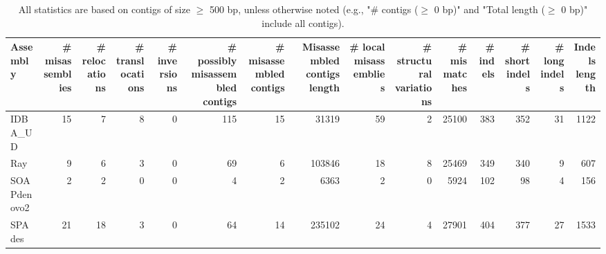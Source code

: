 \documentclass[12pt,a4paper]{article}
\begin{document}
\begin{table}[ht]
\begin{center}
\caption{All statistics are based on contigs of size $\geq$ 500 bp, unless otherwise noted (e.g., "\# contigs ($\geq$ 0 bp)" and "Total length ($\geq$ 0 bp)" include all contigs).}
\begin{tabular}{|l*{14}{|r}|}
\hline
Assembly & \# misassemblies &     \# relocations &     \# translocations &     \# inversions & \# possibly misassembled contigs & \# misassembled contigs & Misassembled contigs length & \# local misassemblies & \# structural variations & \# mismatches & \# indels &     \# short indels &     \# long indels & Indels length \\ \hline
IDBA\_UD & 15 & 7 & 8 & 0 & 115 & 15 & 31319 & 59 & 2 & 25100 & 383 & 352 & 31 & 1122 \\ \hline
Ray & 9 & 6 & 3 & 0 & 69 & 6 & 103846 & 18 & 8 & 25469 & 349 & 340 & 9 & 607 \\ \hline
SOAPdenovo2 & 2 & 2 & 0 & 0 & 4 & 2 & 6363 & 2 & 0 & 5924 & 102 & 98 & 4 & 156 \\ \hline
SPAdes & 21 & 18 & 3 & 0 & 64 & 14 & 235102 & 24 & 4 & 27901 & 404 & 377 & 27 & 1533 \\ \hline
\end{tabular}
\end{center}
\end{table}
\end{document}

